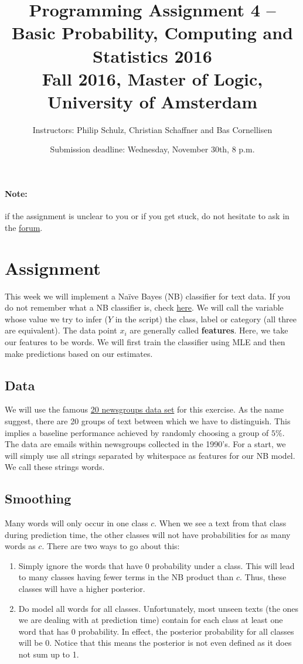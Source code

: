 \documentclass[11pt, leqno, a4paper]{article}
\title{Programming Assignment 4 -- Basic Probability, Computing and Statistics 2016 \\[2mm]
\large{Fall 2016, Master of Logic, University of Amsterdam}}
\author{Instructors: Philip Schulz, Christian Schaffner and Bas Cornellisen}
\date{Submission deadline: Wednesday, November 30th, 8 p.m.}
\begin{document}
\maketitle

\paragraph{Note:} if the assignment is unclear to you or if you get
stuck, do not hesitate to ask in the
\href{https://www.moodle.ch/lms/mod/forum/view.php?id=1721}{forum}.

\section{Assignment}

This week we will implement a Na\"ive Bayes (NB) classifier for text data. If you do not remember what a 
NB classifier is, check \href{https://github.com/BasicProbability/LectureNotes/blob/master/chapter4/chapter4.pdf}{here}. 
We will call the variable whose value we try to infer ($ Y $ in the script) the class, label or
category (all three are equivalent). The data point $ x_{i} $ are generally called \textbf{features}.
Here, we take our features to be words.
We will first train the classifier using MLE and then make predictions based on our estimates.

\subsection{Data}

We will use the famous \href{http://qwone.com/~jason/20Newsgroups/}{20 newsgroups data set} for this 
exercise. As the name suggest, there are 20 groups of text between which we have to distinguish. This
implies a baseline performance achieved by randomly choosing a group of $ 5\% $. The data are emails
within newsgroups collected in the 1990's. For a start, we will simply use all strings separated by
whitespace as features for our NB model. We call these strings words.

\subsection{Smoothing}

Many words will only occur in one class $ c $. When we see a text from that class during prediction time, the
other classes will not have probabilities for as many words as $ c $. There are two ways to go about this:
\begin{enumerate}
\item Simply ignore the words that have 0 probability under a class. This will lead to many classes
having fewer terms in the NB product than $ c $. Thus, these classes will have a higher posterior.
\item Do model all words for all classes. Unfortunately, most unseen texts (the ones we are dealing
with at prediction time) contain for each class at least one word that has 0 probability. In effect, the
posterior probability for all classes will be 0. Notice that this means the posterior is not even defined
as it does not sum up to 1.
\end{enumerate} 
\end{document}
